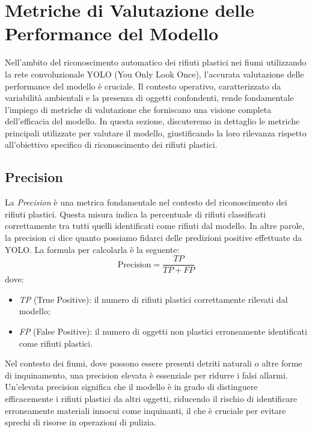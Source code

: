 
\section{Metriche di Valutazione delle Performance del Modello}

Nell'ambito del riconoscimento automatico dei rifiuti plastici nei fiumi utilizzando la rete convoluzionale YOLO (You Only Look Once), l'accurata valutazione delle performance del modello è cruciale. Il contesto operativo, caratterizzato da variabilità ambientali e la presenza di oggetti confondenti, rende fondamentale l'impiego di metriche di valutazione che forniscano una visione completa dell'efficacia del modello. In questa sezione, discuteremo in dettaglio le metriche principali utilizzate per valutare il modello, giustificando la loro rilevanza rispetto all'obiettivo specifico di riconoscimento dei rifiuti plastici.

\subsection{Precision}

La \textit{Precision} è una metrica fondamentale nel contesto del riconoscimento dei rifiuti plastici. Questa misura indica la percentuale di rifiuti classificati correttamente tra tutti quelli identificati come rifiuti dal modello. In altre parole, la precision ci dice quanto possiamo fidarci delle predizioni positive effettuate da YOLO. La formula per calcolarla è la seguente:
\begin{equation}
\text{Precision} = \frac{TP}{TP + FP}
\end{equation}
dove:
\begin{itemize}
    \item \textit{TP} (True Positive): il numero di rifiuti plastici correttamente rilevati dal modello;
    \item \textit{FP} (False Positive): il numero di oggetti non plastici erroneamente identificati come rifiuti plastici.
\end{itemize}

Nel contesto dei fiumi, dove possono essere presenti detriti naturali o altre forme di inquinamento, una precision elevata è essenziale per ridurre i falsi allarmi. Un'elevata precision significa che il modello è in grado di distinguere efficacemente i rifiuti plastici da altri oggetti, riducendo il rischio di identificare erroneamente materiali innocui come inquinanti, il che è cruciale per evitare sprechi di risorse in operazioni di pulizia.

